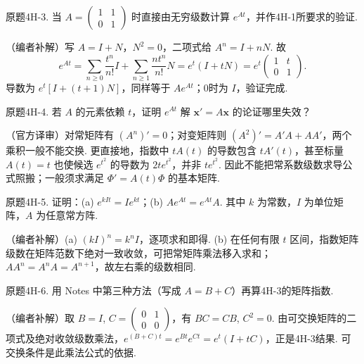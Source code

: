 \begin{exercise}\label{cw:bank-4H-3}原题4H-3. 当 $A=\begin{pmatrix}1&1\\0&1\end{pmatrix}$ 时直接由无穷级数计算 $e^{At}$，并作4H-1所要求的验证.\end{exercise}
\begin{solution}（编者补解）写 $A=I+N$，$N^2=0$，二项式给 $A^n=I+nN$. 故
\[e^{At}=\sum_{n\ge0}\frac{t^n}{n!}I+\sum_{n\ge1}\frac{nt^n}{n!}N=e^t(I+tN)=e^t\begin{pmatrix}1&t\\0&1\end{pmatrix}.\]
导数为 $e^t[I+(t+1)N]$，同样等于 $A e^{At}$；0时为 $I$，验证完成.\end{solution}
\begin{exercise}\label{cw:bank-4H-4}原题4H-4. 若 $A$ 的元素依赖 $t$，证明 $e^{At}$ 解 $\mathbf x'=A\mathbf x$ 的论证哪里失效？\end{exercise}
\begin{solution}（官方译审）对常矩阵有 $(A^n)'=0$；对变矩阵则 $(A^2)'=A'A+AA'$，两个乘积一般不能交换. 更直接地，指数中 $tA(t)$ 的导数包含 $tA'(t)$，甚至标量 $A(t)=t$ 也使候选 $e^{t^2}$ 的导数为 $2te^{t^2}$，并非 $te^{t^2}$. 因此不能把常系数级数求导公式照搬；一般须求满足 $\Phi'=A(t)\Phi$ 的基本矩阵.\end{solution}
\begin{exercise}\label{cw:bank-4H-5}原题4H-5. 证明：(a) $e^{kIt}=Ie^{kt}$；(b) $Ae^{At}=e^{At}A$. 其中 $k$ 为常数，$I$ 为单位矩阵，$A$ 为任意常方阵.\end{exercise}
\begin{solution}（编者补解）(a) $(kI)^n=k^nI$，逐项求和即得. (b) 在任何有限 $t$ 区间，指数矩阵级数在矩阵范数下绝对一致收敛，可把常矩阵乘法移入求和；$A A^n=A^n A=A^{n+1}$，故左右乘的级数相同.\end{solution}
\begin{exercise}\label{cw:bank-4H-6}原题4H-6. 用 Notes 中第三种方法（写成 $A=B+C$）再算4H-3的矩阵指数.\end{exercise}
\begin{solution}（编者补解）取 $B=I$, $C=\begin{pmatrix}0&1\\0&0\end{pmatrix}$，有 $BC=CB$, $C^2=0$. 由可交换矩阵的二项式及绝对收敛级数乘法，$e^{(B+C)t}=e^{Bt}e^{Ct}=e^t(I+tC)$，正是4H-3结果. 可交换条件是此乘法公式的依据.\end{solution}
